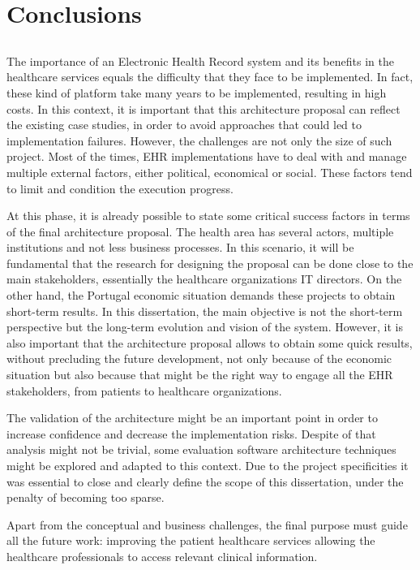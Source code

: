 \chapter{Conclusions} \label{chap:concl}

\section*{}

The importance of an Electronic Health Record system and its benefits in the healthcare services equals the difficulty that they face to be implemented. In fact, these kind of platform take many years to be implemented, resulting in high costs. In this context, it is important that this architecture proposal can reflect the existing case studies, in order to avoid approaches that could led to implementation failures. However, the challenges are not only the size of such project. Most of the times, EHR implementations have to deal with and manage multiple external factors, either political, economical or social. These factors tend to limit and condition the execution progress.

At this phase, it is already possible to state some critical success factors in terms of the final architecture proposal. The health area has several actors, multiple institutions and not less business processes. In this scenario, it will be fundamental that the research for designing the proposal can be done close to the main stakeholders, essentially the healthcare organizations IT directors. On the other hand, the Portugal economic situation demands these projects to obtain short-term results. In this dissertation, the main objective is not the short-term perspective but the long-term evolution and vision of the system. However, it is also important that the architecture proposal allows to obtain some quick results, without precluding the future development, not only because of the economic situation but also because that might be the right way to engage all the EHR stakeholders, from patients to healthcare organizations.

The validation of the architecture might be an important point in order to increase confidence and decrease the implementation risks. Despite of that analysis might not be trivial, some evaluation software architecture techniques might be explored and adapted to this context. Due to the project specificities it was essential to close and clearly define the scope of this dissertation, under the penalty of becoming too sparse.

Apart from the conceptual and business challenges, the final purpose must guide all the future work: improving the patient healthcare services allowing the healthcare professionals to access relevant clinical information.
